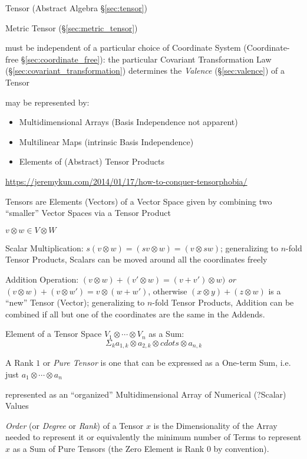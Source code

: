 \fist Tensor (Abstract Algebra \S\ref{sec:tensor})

\fist Metric Tensor (\S\ref{sec:metric_tensor})

must be independent of a particular choice of Coordinate System
(Coordinate-free \S\ref{sec:coordinate_free}): the particular Covariant
Transformation Law (\S\ref{sec:covariant_transformation}) determines
the \emph{Valence} (\S\ref{sec:valence}) of a Tensor

may be represented by:
\begin{itemize}
  \item Multidimensional Arrays (Basis Independence not apparent)
  \item Multilinear Maps (intrinsic Basis Independence)
  \item Elements of (Abstract) Tensor Products
\end{itemize}

\fist
\url{https://jeremykun.com/2014/01/17/how-to-conquer-tensorphobia/}

Tensors are Elements (Vectors) of a Vector Space given by
combining two ``smaller'' Vector Spaces via a Tensor Product

$v \otimes w \in V \otimes W$

Scalar Multiplication: $s(v \otimes w) = (sv \otimes w) = (v \otimes
sw)$; generalizing to  $n$-fold Tensor Products, Scalars can be moved
around all the coordinates freely

Addition Operation: $(v \otimes w) + (v' \otimes w) = (v + v') \otimes
w)$ \emph{or} $(v \otimes w) + (v \otimes w') = v \otimes (w + w')$,
otherwise $(x \otimes y) + (z \otimes w)$ is a ``new'' Tensor
(Vector); generalizing to $n$-fold Tensor Products, Addition can be
combined if all but one of the coordinates are the same in the
Addends.

Element of a Tensor Space $V_1 \otimes \cdots \otimes V_n$ as a Sum:
\[
  \Sigma_k a_{1,k} \otimes a_{2,k} \otimes cdots \otimes a_{n,k}
\]

A Rank $1$ or \emph{Pure Tensor} is one that can be expressed as a
One-term Sum, i.e. just $a_1 \otimes \cdots \otimes a_n$


\asterism


represented as an ``organized'' Multidimensional Array of Numerical
(?Scalar) Values

\emph{Order} (or \emph{Degree} or \emph{Rank}) of a Tensor $x$ is the
Dimensionality of the Array needed to represent it or equivalently the
minimum number of Terms to represent $x$ as a Sum of Pure Tensors (the
Zero Element is Rank $0$ by convention).


